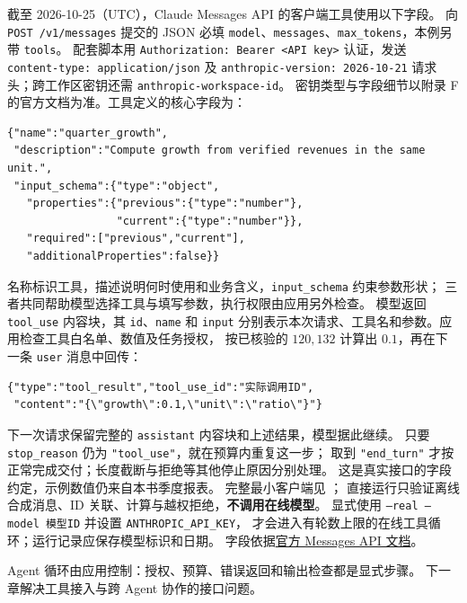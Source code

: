 截至 2026-10-25（UTC），Claude Messages API 的客户端工具使用以下字段。
向 \texttt{POST /v1/messages} 提交的 JSON 必填 \texttt{model}、\texttt{messages}、\texttt{max\_tokens}，本例另带 \texttt{tools}。
配套脚本用 \texttt{Authorization: Bearer <API key>} 认证，发送 \texttt{content-type: application/json}
及 \texttt{anthropic-version: 2026-10-21} 请求头；跨工作区密钥还需 \texttt{anthropic-workspace-id}。
密钥类型与字段细节以附录 F 的官方文档为准。工具定义的核心字段为：
\begin{Verbatim}[fontsize=\small]
{"name":"quarter_growth",
 "description":"Compute growth from verified revenues in the same unit.",
 "input_schema":{"type":"object",
   "properties":{"previous":{"type":"number"},
                 "current":{"type":"number"}},
   "required":["previous","current"],
   "additionalProperties":false}}
\end{Verbatim}
名称标识工具，描述说明何时使用和业务含义，\texttt{input\_schema} 约束参数形状；
三者共同帮助模型选择工具与填写参数，执行权限由应用另外检查。
模型返回 \texttt{tool\_use} 内容块，其 \texttt{id}、\texttt{name} 和 \texttt{input}
分别表示本次请求、工具名和参数。应用检查工具白名单、数值及任务授权，
按已核验的 $120,132$ 计算出 $0.1$，再在下一条 \texttt{user} 消息中回传：
\begin{Verbatim}[fontsize=\small]
{"type":"tool_result","tool_use_id":"实际调用ID",
 "content":"{\"growth\":0.1,\"unit\":\"ratio\"}"}
\end{Verbatim}
下一次请求保留完整的 \texttt{assistant} 内容块和上述结果，模型据此继续。
只要 \texttt{stop\_reason} 仍为 \texttt{"tool\_use"}，就在预算内重复这一步；
取到 \texttt{"end\_turn"} 才按正常完成交付；长度截断与拒绝等其他停止原因分别处理。
这是真实接口的字段约定，示例数值仍来自本书季度报表。
完整最小客户端见 ；
直接运行只验证离线合成消息、ID 关联、计算与越权拒绝，\textbf{不调用在线模型}。
显式使用 \texttt{--real --model 模型ID} 并设置 \texttt{ANTHROPIC\_API\_KEY}，
才会进入有轮数上限的在线工具循环；运行记录应保存模型标识和日期。
字段依据\href{https://platform.claude.com/docs/en/api/messages/create}{官方 Messages API 文档}。

\par\smallskip
Agent 循环由应用控制：授权、预算、错误返回和输出检查都是显式步骤。
下一章解决工具接入与跨 Agent 协作的接口问题。
